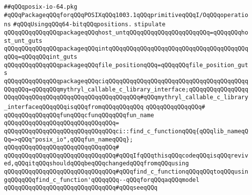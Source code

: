 \label{src/lib/std/src/psx/posix-io-64.pkg}
\verb|##qQQqposix-io-64.pkg|\newline
\newline
\newline
\newline
\verb|#qQQqPackageqQQqforqQQqPOSIXqQQq1003.1qQQqprimitiveqQQqI/OqQQqoperations|\newline
\verb|#qQQqUsingqQQq64-bitqQQqpositions.|\newline
\newline
\newline
\newline
\verb|stipulate|\newline
\verb|qQQqqQQqqQQqqQQqpackageqQQqhost_untqQQqqQQqqQQqqQQqqQQqqQQq=qQQqqQQqhost_unt_guts|\newline
\verb|qQQqqQQqqQQqqQQqpackageqQQqintqQQqqQQqqQQqqQQqqQQqqQQqqQQqqQQqqQQqqQQqqQQq=qQQqqQQqint_guts|\newline
\verb|qQQqqQQqqQQqqQQqpackageqQQqfile_positionqQQq=qQQqqQQqfile_position_guts|\newline
\verb|qQQqqQQqqQQqqQQqpackageqQQqciqQQqqQQqqQQqqQQqqQQqqQQqqQQqqQQqqQQqqQQqqQQqqQQq=qQQqqQQqmythryl_callable_c_library_interface;qQQqqQQqqQQqqQQqqQQqqQQqqQQqqQQqqQQqqQQqqQQqqQQqqQQqqQQq#qQQqmythryl_callable_c_library_interfaceqQQqqQQqisqQQqfromqQQqqQQqqQQq|\newline
\verb|qQQqqQQqqQQqqQQq#|\newline
\verb|qQQqqQQqqQQqqQQqfunqQQqcfunqQQqqQQqfun_name|\newline
\verb|qQQqqQQqqQQqqQQqqQQqqQQqqQQqqQQq=|\newline
\verb|qQQqqQQqqQQqqQQqqQQqqQQqqQQqqQQqci::find_c_functionqQQq{qQQqlib_nameqQQq=>qQQq"posix_io",qQQqfun_nameqQQq};|\newline
\verb|qQQqqQQqqQQqqQQqqQQqqQQqqQQqqQQq#|\newline
\verb|qQQqqQQqqQQqqQQqqQQqqQQqqQQqqQQq#qQQqIfqQQqthisqQQqcodeqQQqisqQQqrevived,qQQqitqQQqshouldqQQqbeqQQqchangedqQQqfromqQQqusing|\newline
\verb|qQQqqQQqqQQqqQQqqQQqqQQqqQQqqQQq#qQQqfind_c_functionqQQqqQQqtoqQQqusingqQQqqQQqfind_c_function'qQQqqQQq--qQQqforqQQqaqQQqmodel|\newline
\verb|qQQqqQQqqQQqqQQqqQQqqQQqqQQqqQQq#qQQqseeqQQq|\newline
